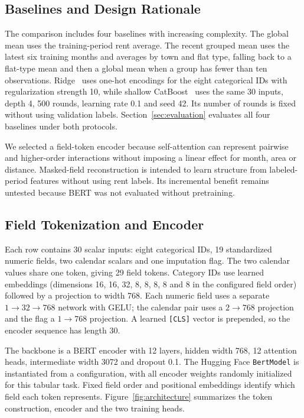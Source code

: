 \subsection{Baselines and Design Rationale}
The comparison includes four baselines with increasing complexity.  The global mean uses the training-period rent average.  The recent grouped mean uses the latest six training months and averages by town and flat type, falling back to a flat-type mean and then a global mean when a group has fewer than ten observations.  Ridge~\cite{hoerl1970ridge} uses one-hot encodings for the eight categorical IDs with regularization strength 10, while shallow CatBoost~\cite{prokhorenkova2018catboost} uses the same 30 inputs, depth 4, 500 rounds, learning rate 0.1 and seed 42.  Its number of rounds is fixed without using validation labels.  Section~\ref{sec:evaluation} evaluates all four baselines under both protocols.

We selected a field-token encoder because self-attention can represent pairwise and higher-order interactions without imposing a linear effect for month, area or distance.  Masked-field reconstruction is intended to learn structure from labeled-period features without using rent labels.  Its incremental benefit remains untested because BERT was not evaluated without pretraining.

\subsection{Field Tokenization and Encoder}
Each row contains 30 scalar inputs: eight categorical IDs, 19 standardized numeric fields, two calendar scalars and one imputation flag.  The two calendar values share one token, giving 29 field tokens.  Category IDs use learned embeddings (dimensions 16, 16, 32, 8, 8, 8, 8 and 8 in the configured field order) followed by a projection to width 768.  Each numeric field uses a separate $1\!\to\!32\!\to\!768$ network with GELU; the calendar pair uses a $2\!\to\!768$ projection and the flag a $1\!\to\!768$ projection.  A learned \texttt{[CLS]} vector is prepended, so the encoder sequence has length 30.

The backbone is a BERT encoder with 12 layers, hidden width 768, 12 attention heads, intermediate width 3072 and dropout 0.1.  The Hugging Face \texttt{BertModel} is instantiated from a configuration, with all encoder weights randomly initialized for this tabular task.  Fixed field order and positional embeddings identify which field each token represents.  Figure~\ref{fig:architecture} summarizes the token construction, encoder and the two training heads.

